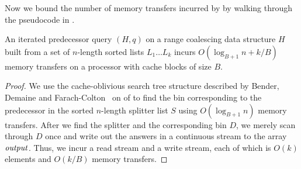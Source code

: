 Now we bound the number of memory transfers incurred by  by walking 
through the pseudocode in .

\begin{theorem}
An iterated predecessor query $(H,q)$ on a range coalescing data 
structure $H$ built from a set of $n$-length sorted lists $L_1 \ldots L_k$ 
incurs $O(\log_{B+1} n + k/B)$ memory transfers on a processor with cache blocks
of size $B$.
\end{theorem}
\begin{proof}
We use the cache-oblivious search tree structure described by Bender, 
Demaine and Farach-Colton~\cite{BenderDeFa00} on  of 
 to find the bin corresponding to the predecessor in the 
sorted $n$-length splitter list $S$ using $O(\log_{B+1}n)$ memory transfers.
After we find the splitter and the corresponding bin $D$, we merely scan through
$D$ once and write out the answers in a continuous stream to the array $\id{output}$.
Thus, we incur a read stream and a write stream, each of which is $O(k)$ elements
and $O(k/B)$ memory transfers.
\end{proof}

